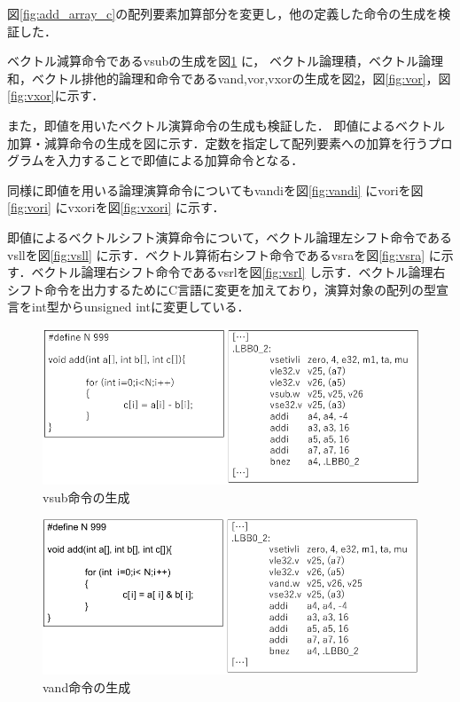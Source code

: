 図\ref{fig:add_array_c}の配列要素加算部分を変更し，他の定義した命令の生成を検証した．

ベクトル減算命令であるvsubの生成を図\ref{fig:vsub}
に，
ベクトル論理積，ベクトル論理和，ベクトル排他的論理和命令であるvand,vor,vxorの生成を図\ref{fig:vand}，図\ref{fig:vor}，図\ref{fig:vxor}に示す．

また，即値を用いたベクトル演算命令の生成も検証した．
即値によるベクトル加算・減算命令の生成を図に示す．定数を指定して配列要素への加算を行うプログラムを入力することで即値による加算命令となる．

同様に即値を用いる論理演算命令についてもvandiを図\ref{fig:vandi}
にvoriを図\ref{fig:vori}
にvxoriを図\ref{fig:vxori}
に示す．

即値によるベクトルシフト演算命令について，ベクトル論理左シフト命令であるvsllを図\ref{fig:vsll}
に示す．ベクトル算術右シフト命令であるvsraを図\ref{fig:vsra}
に示す．ベクトル論理右シフト命令であるvsrlを図\ref{fig:vsrl}
し示す．ベクトル論理右シフト命令を出力するためにC言語に変更を加えており，演算対象の配列の型宣言をint型からunsigned intに変更している．

\begin{figure}
    \centering
    \includegraphics[scale=0.8]{image/vsub.pdf}
    \caption{vsub命令の生成}
    \label{fig:vsub}
\end{figure}

\begin{figure}
    \centering
    \includegraphics[scale=0.8]{image/vand.pdf}
    \caption{vand命令の生成}
    \label{fig:vand}
\end{figure}


